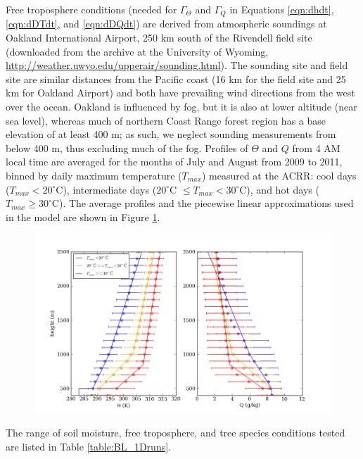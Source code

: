 Free troposphere conditions (needed for $\Gamma_{\Theta}$ and $\Gamma_Q$ in Equations \ref{eqn:dhdt}, \ref{eqn:dDTdt}, and \ref{eqn:dDQdt}) are derived from atmospheric soundings at Oakland International Airport, 250 km south of the Rivendell field site (downloaded from the archive at the University of Wyoming, \url{http://weather.uwyo.edu/upperair/sounding.html}).  The sounding site and field site are similar distances from the Pacific coast (16 km for the field site and 25 km for Oakland Airport) and both have prevailing wind directions from the west over the ocean.  Oakland is influenced by fog, but it is also at lower altitude (near sea level), whereas much of northern Coast Range forest region has a base elevation of at least 400 m; as such, we neglect sounding measurements from below 400 m, thus excluding much of the fog.  Profiles of $\Theta$ and $Q$ from 4 AM local time are averaged for the months of July and August from 2009 to 2011, binned by daily maximum temperature ($T_{max}$) measured at the ACRR: cool days ($T_{max} < 20^{\circ}$C), intermediate days ($20^{\circ}$C $\le T_{max} < 30^{\circ}$C), and hot days ($T_{max} \ge 30^{\circ}$C).  The average profiles and the piecewise linear approximations used in the model are shown in Figure \ref{fig:BL_LapseRates}.

\begin{figure}[here]
\includegraphics[width=1\textwidth]{ch2-BL/figures/fitted_lapserates_theta_Q_onefig.png}
\caption{}
\label{fig:BL_LapseRates}
\end{figure}

The range of soil moisture, free troposphere, and tree species conditions tested are listed in Table \ref{table:BL_1Druns}.  

